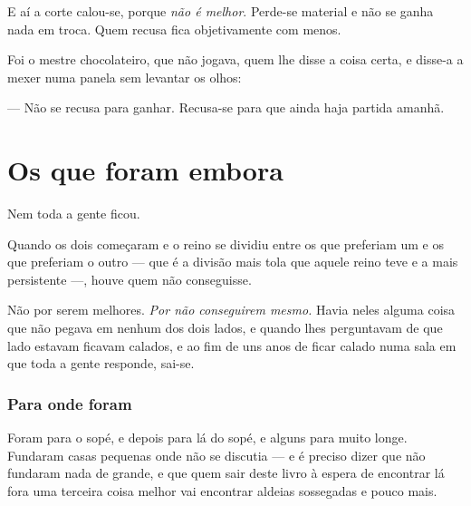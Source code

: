 \documentclass[livro.tex]{subfiles}
\begin{document}
\medskip

E aí a corte calou-se, porque \emph{não é melhor}. Perde-se material e não se ganha nada em troca.
Quem recusa fica objetivamente com menos.

\medskip

Foi o mestre chocolateiro, que não jogava, quem lhe disse a coisa certa, e disse-a a mexer numa
panela sem levantar os olhos:

\medskip

--- Não se recusa para ganhar. Recusa-se para que ainda haja partida amanhã.















\chapter{Os que foram embora}

Nem toda a gente ficou.

\medskip

Quando os dois começaram e o reino se dividiu entre os que preferiam um e os que preferiam o outro
--- que é a divisão mais tola que aquele reino teve e a mais persistente ---, houve quem não
conseguisse.

\medskip

Não por serem melhores. \emph{Por não conseguirem mesmo.} Havia neles alguma coisa que não pegava
em nenhum dos dois lados, e quando lhes perguntavam de que lado estavam ficavam calados, e ao fim
de uns anos de ficar calado numa sala em que toda a gente responde, sai-se.

\subsection*{Para onde foram}

Foram para o sopé, e depois para lá do sopé, e alguns para muito longe. Fundaram casas pequenas
onde não se discutia --- e é preciso dizer que não fundaram nada de grande, e que quem sair deste
livro à espera de encontrar lá fora uma terceira coisa melhor vai encontrar aldeias sossegadas e
pouco mais.
\end{document}
